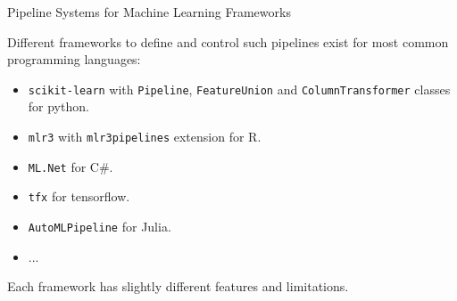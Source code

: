 	\begin{frame}{Pipeline Systems for Machine Learning Frameworks}

		Different frameworks to define and control such pipelines exist for most common programming languages:

		\begin{itemize}
			\item \texttt{scikit-learn} with \texttt{Pipeline}, \texttt{FeatureUnion} and \texttt{ColumnTransformer} classes for python.
			\item \texttt{mlr3} with \texttt{mlr3pipelines} extension for R.
			\item \texttt{ML.Net} for C\#.
			\item \texttt{tfx} for tensorflow.
			\item \texttt{AutoMLPipeline} for Julia.
			\item ...
		\end{itemize}

	Each framework has slightly different features and limitations. 
	
	\end{frame}

	
	
	
	
	

